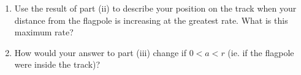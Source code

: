 \documentclass{ximera}
\begin{document}
\begin{question}
\begin{enumerate}
\begin{enumerate}
\item Use the result of part (ii) to describe your position on the track when your distance from the flagpole is increasing at the greatest rate. What is this maximum rate?

\item How would your answer to part (iii) change if $0<a<r$ (ie. if the flagpole were inside the track)?

\end{enumerate}
\end{enumerate}

\end{question}
\end{document}
